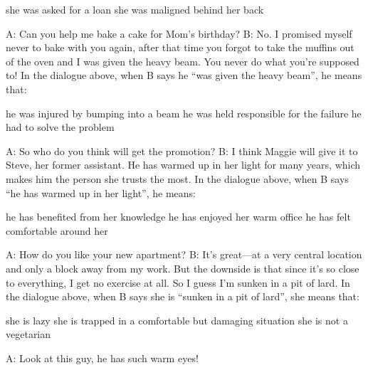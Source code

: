 \documentclass[output=paper]{langsci/langscibook}
\begin{document}
\begin{paperappendix}
{\begin{exe}
\begin{xlist}
\begin{xlist}
         she was asked for a loan
         she was maligned behind her back
        \end{xlist}
        \end{xlist}
    \newpage
     \begin{xlist}
        \sn A: Can you help me bake a cake for Mom's birthday?
        \sn B: No. I promised myself never to bake with you again, after that time you forgot to take the muffins out of the oven and I was given the heavy beam. You never do what you're supposed to!
        \sn In the dialogue above, when B says he \enquote{was given the heavy beam}, he means that:
        \begin{xlist}
         he was injured by bumping into a beam
         he was held responsible for the failure
         he had to solve the problem
        \end{xlist}
        \end{xlist}
     \begin{xlist}
        \sn A: So who do you think will get the promotion?
        \sn B: I think Maggie will give it to Steve, her former assistant. He has warmed up in her light for many years, which makes him the person she trusts the most.
        \sn In the dialogue above, when B says \enquote{he has warmed up in her light}, he means:
        \begin{xlist}
         he has benefited from her knowledge
         he has enjoyed her warm office
         he has felt comfortable around her
        \end{xlist}
        \end{xlist}
     \begin{xlist}
        \sn A: How do you like your new apartment?
        \sn B: It's great—at a very central location and only a block away from my work. But the downside is that since it's so close to everything, I get no exercise at all. So I guess I’m sunken in a pit of lard.
        \sn In the dialogue above, when B says she is \enquote{sunken in a pit of lard}, she means that:
        \begin{xlist}
         she is lazy
         she is trapped in a comfortable but damaging situation
         she is not a vegetarian
        \end{xlist}
        \end{xlist}
     \begin{xlist}
        \sn A: Look at this guy, he has such warm eyes!

\end{xlist}
\end{exe}}
\end{paperappendix}
\end{document}
